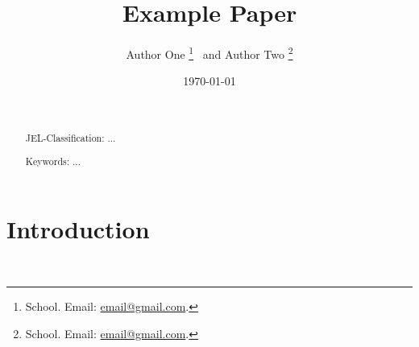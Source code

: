 \documentclass[12pt]{article}
\title{Example Paper}
\author{
    Author One%
    \thanks{School. Email: \href{mailto:email@gmail.com}{email@gmail.com}.} \ and Author Two%
    \thanks{School. Email: \href{mailto:email@gmail.com}{email@gmail.com}.}
}
\date{\textsc{\today}}
\begin{document}
\maketitle
\begin{abstract}


  \par~\par\noindent
  {\color{asher}JEL-Classification:} ...
  \par\noindent
  {\color{asher}Keywords:} ...
  \par\vspace{-2.5mm}
\end{abstract}

\newpage



\section{Introduction}







\newpage~\appendix
{}
\renewcommand{\thefigure}{\Alph{section}\arabic{figure}}
\renewcommand{\thetable}{\Alph{section}\arabic{table}}
\end{document}
